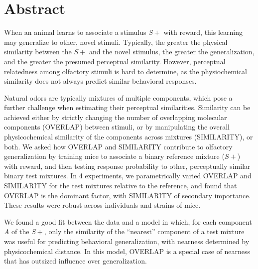 \section{Abstract} 

When an animal learns to associate a stimulus $S+$ with reward, this learning may generalize to other, novel stimuli. Typically, the greater the physical similarity between the $S+$ and the novel stimulus, the greater the generalization, and the greater the presumed perceptual similarity. However, perceptual relatedness among olfactory stimuli is hard to determine, as the physiochemical similarity does not always predict similar behavioral responses.

Natural odors are typically mixtures of multiple components, which pose a further challenge when estimating their perceptual similarities.  Similarity can be achieved either by strictly changing the number of overlapping molecular components (OVERLAP) between stimuli, or by manipulating the overall physicochemical similarity of the components across mixtures (SIMILARITY), or both.  We asked how OVERLAP and SIMILARITY contribute to olfactory generalization by training mice to associate a binary reference mixture ($S+$) with reward, and then testing response probability to other, perceptually similar binary test mixtures.  In 4 experiments, we parametrically varied OVERLAP and SIMILARITY for the test mixtures relative to the reference, and found that OVERLAP is the dominant factor, with SIMILARITY of secondary importance.  These results were robust across individuals and strains of mice.

We found a good fit between the data and a model in which, for each component \textit{A} of the $S+$, only the similarity of the ``nearest'' component  of a test mixture was useful for predicting behavioral generalization, with nearness determined by physicochemical distance.  In this model, OVERLAP is a special case of nearness that has outsized influence over generalization.  